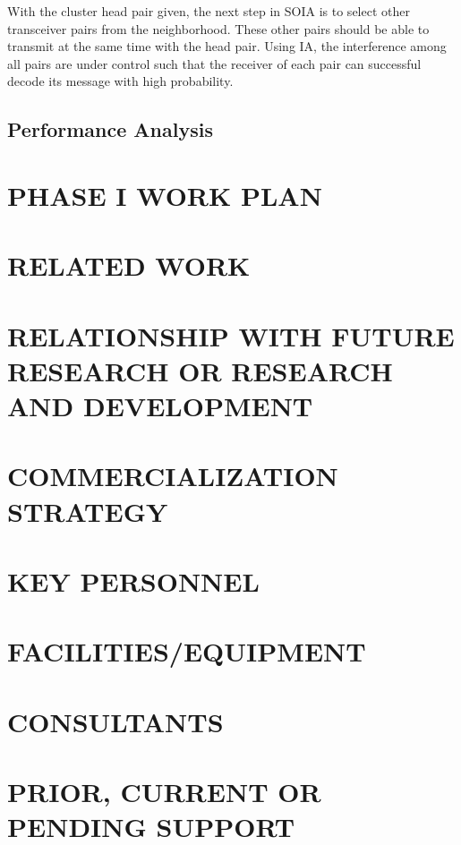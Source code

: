 \documentclass[letterpaper,11pt,onecolumn]{article}
\begin{document}
With the cluster head pair given, the next step in SOIA is to select other transceiver pairs from the neighborhood. These other pairs should be able to transmit at the same time with the head pair. Using IA, the interference among all pairs are under control such that the receiver of each pair can successful decode its message with high probability.

\subsection{Performance Analysis}


\section{PHASE I WORK PLAN}

\section{RELATED WORK}

\section{RELATIONSHIP WITH FUTURE RESEARCH OR RESEARCH AND DEVELOPMENT}

\section{COMMERCIALIZATION STRATEGY}

\section{KEY PERSONNEL}

\section{FACILITIES/EQUIPMENT}

\section{CONSULTANTS}

\section{PRIOR, CURRENT OR PENDING SUPPORT}



\end{document}
